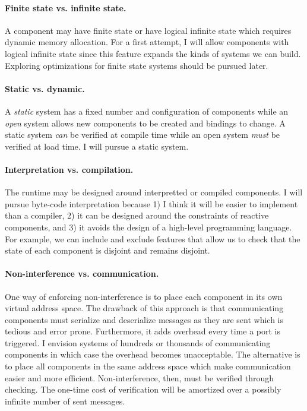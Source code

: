 \documentclass[letterpaper]{article}
\theoremstyle{definition} \newtheorem{constraint}{Constraint}
\begin{document}
\paragraph{Finite state vs. infinite state.}
A component may have finite state or have logical infinite state which requires dynamic memory allocation.
For a first attempt, I will allow components with logical infinite state since this feature expands the kinds of systems we can build.
Exploring optimizations for finite state systems should be pursued later.

\paragraph{Static vs. dynamic.}
A \emph{static} system has a fixed number and configuration of components while an \emph{open} system allows new components to be created and bindings to change.
A static system \emph{can} be verified at compile time while an open system \emph{must} be verified at load time.
I will pursue a static system.

\paragraph{Interpretation vs. compilation.}
The runtime may be designed around interpretted or compiled components.
I will pursue byte-code interpretation because 1) I think it will be easier to implement than a compiler, 2) it can be designed around the constraints of reactive components, and 3) it avoids the design of a high-level programming language.
For example, we can include and exclude features that allow us to check that the state of each component is disjoint and remains disjoint.

\paragraph{Non-interference vs. communication.}
One way of enforcing non-interference is to place each component in its own virtual address space.
The drawback of this approach is that communicating components must serialize and deserialize messages as they are sent which is tedious and error prone.
Furthermore, it adds overhead every time a port is triggered.
I envision systems of hundreds or thousands of communicating components in which case the overhead becomes unacceptable.
The alternative is to place all components in the same address space which make communication easier and more efficient.
Non-interference, then, must be verified through checking.
The one-time cost of verification will be amortized over a possibly infinite number of sent messages.
\end{document}
